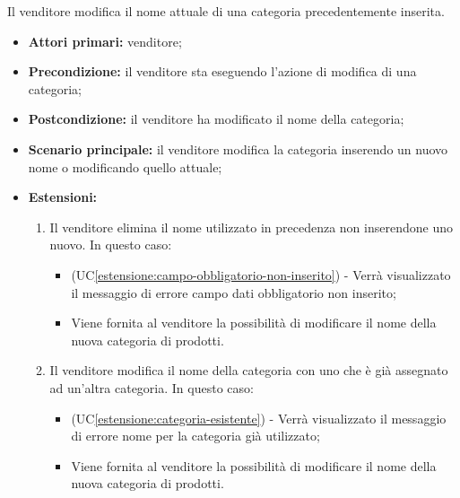 Il venditore modifica il nome attuale di una categoria precedentemente inserita.
\begin{itemize}
    \item \textbf{Attori primari:} venditore;
    \item \textbf{Precondizione:} il venditore sta eseguendo l'azione di modifica di una categoria;
    \item \textbf{Postcondizione:} il venditore ha modificato il nome della categoria;
    \item \textbf{Scenario principale:} il venditore modifica la categoria inserendo un nuovo nome o modificando quello attuale;
    \item \textbf{Estensioni:}
    \begin{enumerate}[label=\lett]
    	\item Il venditore elimina il nome utilizzato in precedenza non inserendone uno nuovo. In questo caso:
    	\begin{itemize}
    		\item (UC\ref{estensione:campo-obbligatorio-non-inserito}) - Verrà visualizzato il messaggio di errore campo dati obbligatorio non inserito;
    		\item Viene fornita al venditore la possibilità di modificare il nome della nuova categoria di prodotti.
    	\end{itemize}
    	\item Il venditore modifica il nome della categoria con uno che è già assegnato ad un'altra categoria. In questo caso:
		\begin{itemize}
			\item (UC\ref{estensione:categoria-esistente}) - Verrà visualizzato il messaggio di errore nome per la categoria già utilizzato;
			\item Viene fornita al venditore la possibilità di modificare il nome della nuova categoria di prodotti.
		\end{itemize}
    \end{enumerate}
\end{itemize}

\label{eliminazione-categoria}

